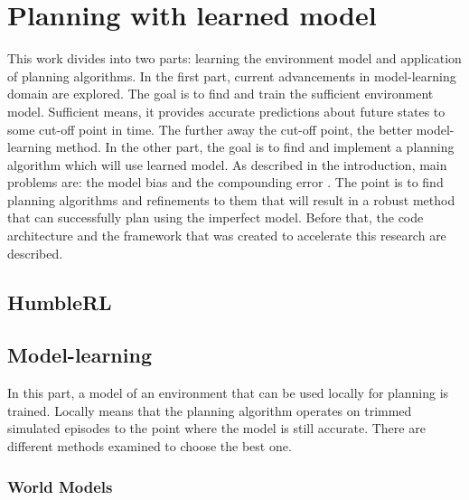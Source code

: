 \section{Planning with learned model}

This work divides into two parts: learning the environment model and application of planning algorithms. In the first part, current advancements in model-learning domain are explored. The goal is to find and train  the sufficient environment model. Sufficient means, it provides accurate predictions about future states to some cut-off point in time. The further away the cut-off point, the better model-learning method.
In the other part, the goal is to find and implement  a planning algorithm which will use learned model. As described in the introduction, main problems are: the model bias and the compounding error . The point is to find planning algorithms and refinements to them that will result in a robust method that can successfully plan using the imperfect model.
Before that, the code architecture and the framework that was created to accelerate this research are described.

\subsection{HumbleRL}

\subsection{Model-learning}

In this part, a model of an environment that can be used locally for planning is trained. Locally means that the planning algorithm operates on trimmed simulated episodes to the point where the model is still accurate. There are different methods examined to choose the best one.

\subsubsection{World Models}

